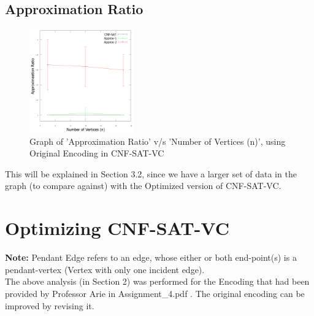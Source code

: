 \documentclass[11pt]{llncs}
\begin{document}
    \subsection{Approximation Ratio}
	\vspace{-9mm}

	\begin{figure}[H]
		\includegraphics[width=0.4\textwidth]{original_ar_vs_n.png}
		\caption{Graph of 'Approximation Ratio' v/s 'Number of Vertices (n)', using Original Encoding \cite{a4_pdf} in CNF-SAT-VC} \label{fig2}
	\end{figure}

	\vspace{-6mm}

	This will be explained in Section 3.2, since we have a larger set of data in the graph (to compare against) with the Optimized version of CNF-SAT-VC.\\

\section{Optimizing CNF-SAT-VC}
	\textbf{Note:} Pendant Edge refers to an edge, whose either or both end-point(s) is a  pendant-vertex (Vertex with only one incident edge).\\

	The above analysis (in Section 2) was performed for the Encoding that had been provided by Professor Arie in Assignment\_4.pdf \cite{a4_pdf}. The original encoding can be improved by revising it.\\

	
\end{document}

